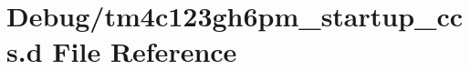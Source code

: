 \hypertarget{tm4c123gh6pm__startup__ccs_8d}{}\section{Debug/tm4c123gh6pm\+\_\+startup\+\_\+ccs.d File Reference}
\label{tm4c123gh6pm__startup__ccs_8d}
